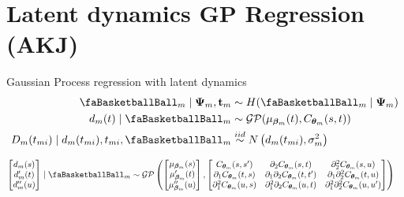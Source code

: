 \documentclass[ignorenonframetext,xcolor=pdflatex,table,dvipsnames,serif]{beamer}
\newcommand{\BTheta}{\text{\faBasketballBall}}
\begin{document}
\section{Latent dynamics GP Regression (AKJ)}
\begin{frame}{Gaussian Process regression with latent dynamics}
\begin{align*}
\begin{split}
  \BTheta_m \mid \bm{\Psi}_m, \mathbf{t}_m &\sim H(\BTheta_m \mid \bm{\Psi}_m)\\
  d_m(t) \mid \BTheta_m &\sim \mathcal{GP}(\mu_{\bm{\beta}_m}(t), C_{\bm{\theta}_m}(s, t))\\
  D_m(t_{mi}) \mid d_m(t_{mi}), t_{mi}, \BTheta_m &\overset{iid}{\sim} N\left(d_m(t_{mi}), \sigma_{m}^2\right)
\end{split}
\end{align*}

{
\scriptsize
\begin{align*}
  \begin{bmatrix}d_m(s)\\ d^{\prime}_m(t)\\ d^{\prime\prime}_m(u)\end{bmatrix} \mid \BTheta_m &\sim \mathcal{GP}\left(\begin{bmatrix}\mu_{\bm{\beta}_m}(s)\\ \mu^{\prime}_{\bm{\beta}_m}(t)\\ \mu^{\prime\prime}_{\bm{\beta}_m}(u)\end{bmatrix}, \begin{bmatrix}C_{\bm{\theta}_m}(s, s^\prime) & \partial_2 C_{\bm{\theta}_m}(s, t) & \partial_2^2 C_{\bm{\theta}_m}(s, u)\\ \partial_1 C_{\bm{\theta}_m}(t, s) & \partial_1 \partial_2 C_{\bm{\theta}_m}(t, t^\prime) & \partial_1 \partial_2^2 C_{\bm{\theta}_m}(t, u)\\ \partial_1^2 C_{\bm{\theta}_m}(u, s) & \partial_1^2\partial_2 C_{\bm{\theta}_m}(u, t) & \partial_1^2 \partial_2^2 C_{\bm{\theta}_m}(u, u^\prime)\end{bmatrix}\right)
\end{align*}
}
\end{frame}
\end{document}
